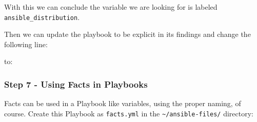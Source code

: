 With this we can conclude the variable we are looking for is labeled
\texttt{ansible\_distribution}.

Then we can update the playbook to be explicit in its findings and
change the following line:

\begin{Shaded}
\begin{Highlighting}[]
\KeywordTok{:}
\KeywordTok{{-}}\AttributeTok{ }
\end{Highlighting}
\end{Shaded}

to:

\begin{Shaded}
\begin{Highlighting}[]
\KeywordTok{:}
\KeywordTok{{-}}\AttributeTok{ }
\end{Highlighting}
\end{Shaded}

\begin{Shaded}
\begin{Highlighting}[]
\ExtensionTok{[student@controller}\NormalTok{ ansible{-}files]$ ansible{-}navigator run setup\_filter.yml }
\end{Highlighting}
\end{Shaded}

\hypertarget{step-7---using-facts-in-playbooks}{%
\subsubsection{Step 7 - Using Facts in
Playbooks}\label{step-7---using-facts-in-playbooks}}

Facts can be used in a Playbook like variables, using the proper naming,
of course. Create this Playbook as \texttt{facts.yml} in the
\texttt{\textasciitilde{}/ansible-files/} directory:

\begin{Shaded}
\begin{Highlighting}[]
\PreprocessorTok{{-}{-}{-}}
\KeywordTok{{-}}\AttributeTok{ }\KeywordTok{:}
\AttributeTok{  }\KeywordTok{:}
\AttributeTok{  }\KeywordTok{:}
\AttributeTok{    }\KeywordTok{{-}}\AttributeTok{ }\KeywordTok{:}
\AttributeTok{      }\KeywordTok{:}
\AttributeTok{        }\KeywordTok{:}
\end{Highlighting}
\end{Shaded}

